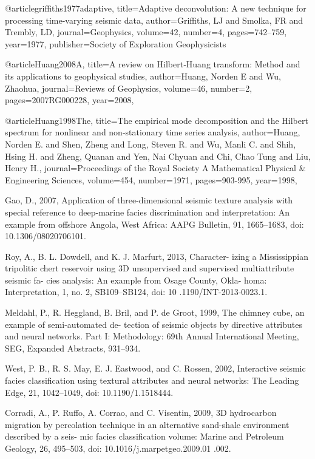 @article{griffiths1977adaptive,
  title={Adaptive deconvolution: A new technique for processing time-varying seismic data},
  author={Griffiths, LJ and Smolka, FR and Trembly, LD},
  journal={Geophysics},
  volume={42},
  number={4},
  pages={742--759},
  year={1977},
  publisher={Society of Exploration Geophysicists}
}

@article{Huang2008A,
  title={A review on {H}ilbert‐{H}uang transform: {M}ethod and its applications to geophysical studies},
  author={Huang, Norden E and Wu, Zhaohua},
  journal={Reviews of Geophysics},
  volume={46},
  number={2},
  pages={2007RG000228},
  year={2008},
}

@article{Huang1998The,
  title={The empirical mode decomposition and the Hilbert spectrum for nonlinear and non-stationary time series analysis},
  author={Huang, Norden E. and Shen, Zheng and Long, Steven R. and Wu, Manli C. and Shih, Hsing H. and Zheng, Quanan and Yen, Nai Chyuan and Chi, Chao Tung and Liu, Henry H.},
  journal={Proceedings of the Royal Society A Mathematical Physical \& Engineering Sciences},
  volume={454},
  number={1971},
  pages={903-995},
  year={1998},
}

Gao, D., 2007, Application of three-dimensional seismic texture analysis with special reference to deep-marine facies discrimination and interpretation: An example from offshore Angola, West Africa: AAPG Bulletin, 91, 1665–1683, doi: 10.1306/08020706101.

Roy, A., B. L. Dowdell, and K. J. Marfurt, 2013, Character- izing a Mississippian tripolitic chert reservoir using 3{D} unsupervised and supervised multiattribute seismic fa- cies analysis: An example from Osage County, Okla- homa: Interpretation, 1, no. 2, SB109–SB124, doi: 10 .1190/INT-2013-0023.1.

Meldahl, P., R. Heggland, B. Bril, and P. de Groot, 1999, The chimney cube, an example of semi‐automated de- tection of seismic objects by directive attributes and neural networks. Part I: Methodology: 69th Annual International Meeting, SEG, Expanded Abstracts, 931–934.

West, P. B., R. S. May, E. J. Eastwood, and C. Rossen, 2002, Interactive seismic facies classification using textural attributes and neural networks: The Leading Edge, 21, 1042–1049, doi: 10.1190/1.1518444.

Corradi, A., P. Ruffo, A. Corrao, and C. Visentin, 2009, 3{D} hydrocarbon migration by percolation technique in an alternative sand-shale environment described by a seis- mic facies classification volume: Marine and Petroleum Geology, 26, 495–503, doi: 10.1016/j.marpetgeo.2009.01 .002.









